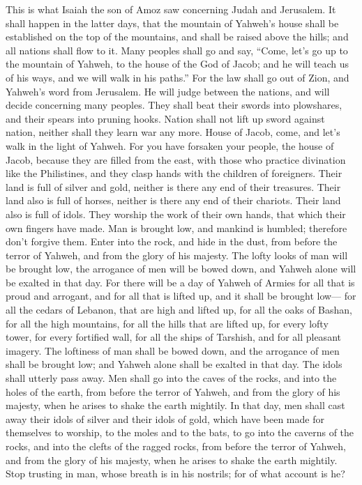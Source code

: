  This is what Isaiah the son of Amoz saw concerning Judah
and Jerusalem.  It shall happen in the latter days, that the
mountain of Yahweh's house shall be established on the top of the
mountains, and shall be raised above the hills; and all nations shall
flow to it.  Many peoples shall go and say, ``Come, let's go
up to the mountain of Yahweh, to the house of the God of Jacob; and he
will teach us of his ways, and we will walk in his paths.'' For the law
shall go out of Zion, and Yahweh's word from Jerusalem.  He
will judge between the nations, and will decide concerning many peoples.
They shall beat their swords into plowshares, and their spears into
pruning hooks. Nation shall not lift up sword against nation, neither
shall they learn war any more.  House of Jacob, come, and
let's walk in the light of Yahweh.  For you have forsaken
your people, the house of Jacob, because they are filled from the east,
with those who practice divination like the Philistines, and they clasp
hands with the children of foreigners.  Their land is full
of silver and gold, neither is there any end of their treasures. Their
land also is full of horses, neither is there any end of their chariots.
 Their land also is full of idols. They worship the work of
their own hands, that which their own fingers have made. 
Man is brought low, and mankind is humbled; therefore don't forgive
them.  Enter into the rock, and hide in the dust, from
before the terror of Yahweh, and from the glory of his majesty.
 The lofty looks of man will be brought low, the arrogance
of men will be bowed down, and Yahweh alone will be exalted in that day.
 For there will be a day of Yahweh of Armies for all that
is proud and arrogant, and for all that is lifted up, and it shall be
brought low---  for all the cedars of Lebanon, that are
high and lifted up, for all the oaks of Bashan,  for all
the high mountains, for all the hills that are lifted up, 
for every lofty tower, for every fortified wall,  for all
the ships of Tarshish, and for all pleasant imagery.  The
loftiness of man shall be bowed down, and the arrogance of men shall be
brought low; and Yahweh alone shall be exalted in that day.
 The idols shall utterly pass away.  Men shall
go into the caves of the rocks, and into the holes of the earth, from
before the terror of Yahweh, and from the glory of his majesty, when he
arises to shake the earth mightily.  In that day, men shall
cast away their idols of silver and their idols of gold, which have been
made for themselves to worship, to the moles and to the bats,
 to go into the caverns of the rocks, and into the clefts
of the ragged rocks, from before the terror of Yahweh, and from the
glory of his majesty, when he arises to shake the earth mightily.
 Stop trusting in man, whose breath is in his nostrils; for
of what account is he?

